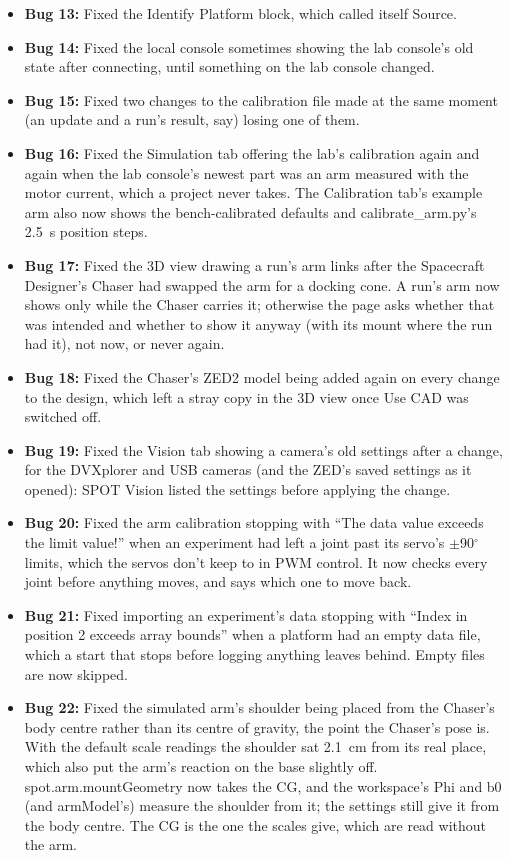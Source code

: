\documentclass[11pt]{article}
\begin{document}
\begin{itemize}[label={\textcolor{primaryColor}{\textbullet}}]
    \item \textbf{Bug 13:} Fixed the Identify Platform block, which called itself Source.
    \item \textbf{Bug 14:} Fixed the local console sometimes showing the lab console's old state after connecting, until something on the lab console changed.
    \item \textbf{Bug 15:} Fixed two changes to the calibration file made at the same moment (an update and a run's result, say) losing one of them.
    \item \textbf{Bug 16:} Fixed the Simulation tab offering the lab's calibration again and again when the lab console's newest part was an arm measured with the motor current, which a project never takes. The Calibration tab's example arm also now shows the bench-calibrated defaults and calibrate\_arm.py's 2.5~s position steps.
    \item \textbf{Bug 17:} Fixed the 3D view drawing a run's arm links after the Spacecraft Designer's Chaser had swapped the arm for a docking cone. A run's arm now shows only while the Chaser carries it; otherwise the page asks whether that was intended and whether to show it anyway (with its mount where the run had it), not now, or never again.
    \item \textbf{Bug 18:} Fixed the Chaser's ZED2 model being added again on every change to the design, which left a stray copy in the 3D view once Use CAD was switched off.
    \item \textbf{Bug 19:} Fixed the Vision tab showing a camera's old settings after a change, for the DVXplorer and USB cameras (and the ZED's saved settings as it opened): SPOT Vision listed the settings before applying the change.
    \item \textbf{Bug 20:} Fixed the arm calibration stopping with ``The data value exceeds the limit value!'' when an experiment had left a joint past its servo's $\pm$90$^\circ$ limits, which the servos don't keep to in PWM control. It now checks every joint before anything moves, and says which one to move back.
    \item \textbf{Bug 21:} Fixed importing an experiment's data stopping with ``Index in position 2 exceeds array bounds'' when a platform had an empty data file, which a start that stops before logging anything leaves behind. Empty files are now skipped.
    \item \textbf{Bug 22:} Fixed the simulated arm's shoulder being placed from the Chaser's body centre rather than its centre of gravity, the point the Chaser's pose is. With the default scale readings the shoulder sat 2.1~cm from its real place, which also put the arm's reaction on the base slightly off. spot.arm.mountGeometry now takes the CG, and the workspace's Phi and b0 (and armModel's) measure the shoulder from it; the settings still give it from the body centre. The CG is the one the scales give, which are read without the arm.
\end{itemize}
\end{document}
